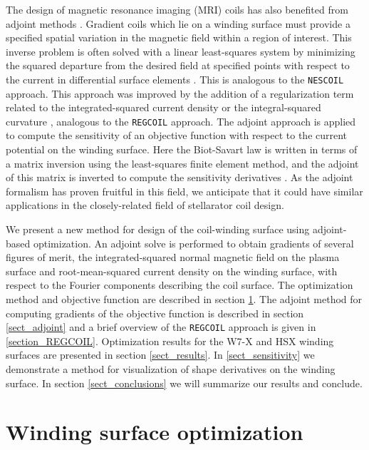\documentclass[aps,unsortedaddress]{revtex4-1}
\begin{document}
The design of magnetic resonance imaging (MRI) coils has also benefited from adjoint methods \cite{Jia2014}. 
Gradient coils which lie on a winding surface must provide a specified spatial variation in the magnetic field within a region of interest. This inverse problem is often solved with a linear least-squares system by minimizing the squared departure from the desired field at specified points with respect to the current in differential surface elements \cite{Turner1993}. This is analogous to the \texttt{NESCOIL} \cite{Merkel1987} approach. This approach was improved by the addition of a regularization term related to the integrated-squared current density \cite{Forbes2005} or the integral-squared curvature \cite{Forbes2001}, analogous to the \texttt{REGCOIL} approach. The adjoint approach is applied to compute the sensitivity of an objective function with respect to the current potential on the winding surface. Here the Biot-Savart law is written in terms of a matrix inversion using the least-squares finite element method, and the adjoint of this matrix is inverted to compute the sensitivity derivatives \cite{Jia2014}. As the adjoint formalism has proven fruitful in this field, we anticipate that it could have similar applications in the closely-related field of stellarator coil design. 

We present a new method for design of the coil-winding surface using adjoint-based optimization. An adjoint solve is performed to obtain gradients of several figures of merit, the integrated-squared normal magnetic field on the plasma surface and root-mean-squared current density on the winding surface, with respect to the Fourier components describing the coil surface. The optimization method and objective function are described in section \ref{sect_opt}. The adjoint method for computing gradients of the objective function is described in section \ref{sect_adjoint} and a brief overview of the \texttt{REGCOIL} approach is given in \ref{section_REGCOIL}. Optimization results for the W7-X and HSX winding surfaces are presented in section \ref{sect_results}. In \ref{sect_sensitivity} we demonstrate a method for visualization of shape derivatives on the winding surface. In section \ref{sect_conclusions} we will summarize our results and conclude. 

\section{Winding surface optimization}
\label{sect_opt}
\end{document}
